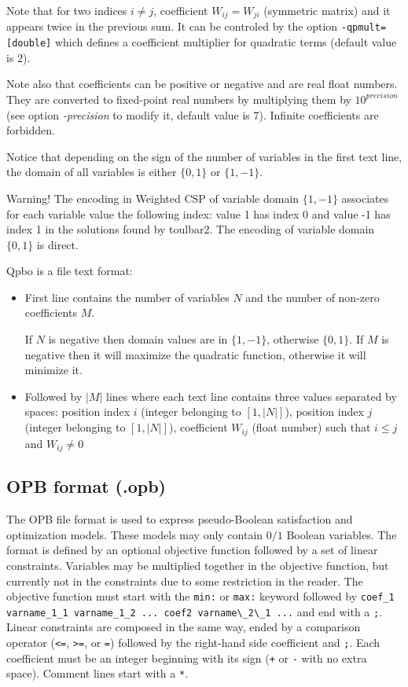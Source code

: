\documentclass{article}
\begin{document}
Note that for two indices $i \neq j$, coefficient $W_{ij} = W_{ji}$ (symmetric matrix) and it appears twice in the previous sum.
It can be controled by the option {\tt -qpmult=[double]} which defines a coefficient multiplier for quadratic terms (default value is 2).

Note also that coefficients can be positive or negative and are real float numbers. They are converted to fixed-point real numbers by multiplying them by $10^{precision}$ (see option {\em -precision} to modify it, default value is 7).  Infinite coefficients are forbidden.

Notice that depending on the sign of the number of variables in the first text line, the domain of all variables is either $\{0,1\}$ or $\{1,-1\}$.

Warning! The encoding in Weighted CSP of variable domain $\{1,-1\}$ associates for each variable value the following index: value 1 has index 0 and value -1 has index 1 in the solutions found by toulbar2.
The encoding  of variable domain $\{0,1\}$ is direct.

Qpbo is a file text format:
\begin{itemize}
\item First line contains the number of variables $N$ and the number of non-zero coefficients $M$.

If $N$ is negative then domain values are in $\{1, -1\}$, otherwise $\{0, 1\}$.
If $M$ is negative then it will maximize the quadratic function, otherwise it will minimize it.

\item Followed by $|M|$ lines where each text line contains three values separated by spaces:
position index $i$ (integer belonging to $[1,|N|]$),
position index $j$ (integer belonging to $[1,|N|]$),
coefficient $W_{ij}$ (float number)
such that $i \leq j$ and $W_{ij} \neq 0$
\end{itemize}

\subsection{OPB format (.opb)}

The OPB file format is used to express pseudo-Boolean satisfaction and optimization models. 
These models may only contain $0/1$ Boolean variables. The format is defined by an optional objective function followed by a set of linear constraints.
Variables may be multiplied together in the objective function, but currently not in the constraints due to some restriction in the reader.
The objective function must start with the \verb!min:! or \verb!max:! keyword followed by \verb!coef_1 varname_1_1 varname_1_2 ... coef2 varname\_2\_1 ...! and end with a \verb!;!.
Linear constraints are composed in the same way, ended by a comparison operator (\verb!<=!, \verb!>=!, or \verb!=!) followed by the right-hand side coefficient and \verb!;!.
Each coefficient must be an integer beginning with its sign (\verb!+! or \verb!-! with no extra space).
Comment lines start with a \verb!*!.
\end{document}
